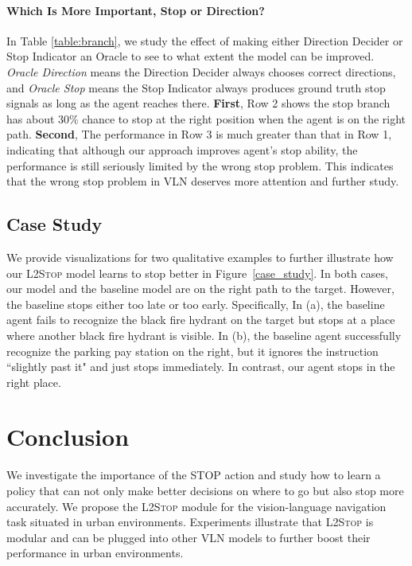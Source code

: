 \documentclass[11pt,a4paper]{article}
\begin{document}
\paragraph{Which Is More Important, Stop or Direction?} 
In Table \ref{table:branch}, we study the effect of making either Direction Decider or Stop Indicator an Oracle to see to what extent the model can be improved. 
\textit{Oracle Direction} means the Direction Decider always chooses correct directions, and \textit{Oracle Stop} means the Stop Indicator always produces ground truth stop signals as long as the agent reaches there. \textbf{First}, Row 2 shows the stop branch has about 30\% chance to stop at the right position when the agent is on the right path. \textbf{Second}, The performance in Row 3 is much greater than that in Row 1, indicating that although our approach improves agent's stop ability, the performance is still seriously limited by the wrong stop problem. This indicates that the wrong stop problem in VLN deserves more attention and further study. 


\subsection{Case Study}
We provide visualizations for two qualitative examples to further illustrate how our \textsc{L2Stop} model learns to stop better in Figure~\ref{case_study}. In both cases, our model and the baseline model are on the right path to the target. However, the baseline stops either too late or too early. Specifically, In (a), the baseline agent fails to recognize the black fire hydrant on the target but stops at a place where another black fire hydrant is visible. In (b), the baseline agent successfully recognize the parking pay station on the right, but it ignores the instruction ``slightly past it" and just stops immediately. In contrast, our agent stops in the right place.

\section{Conclusion}
We investigate the importance of the STOP action and study how to learn a policy that can not only make better decisions on where to go but also stop more accurately.   
We propose the \textsc{L2Stop} module for the vision-language navigation task situated in urban environments. 
Experiments illustrate that \textsc{L2Stop} is modular and can be plugged into other VLN models to further boost their performance in urban environments.
\end{document}
